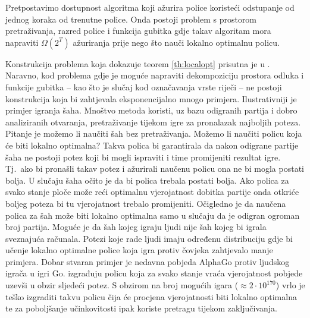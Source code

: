 \begin{theorem} \label{th:localopt}

  Pretpostavimo dostupnost algoritma koji ažurira police koristeći odstupanje od
  jednog koraka od trenutne police. Onda postoji problem s prostorom
  pretraživanja, razred police i funkcija gubitka gdje takav algoritam mora
  napraviti $\Omega(2^T)$ ažuriranja prije nego što nauči lokalno optimalnu
  policu.

\end{theorem}

Konstrukcija problema koja dokazuje teorem \ref{th:localopt} prisutna je u
\citep{daume15lols}. Naravno, kod problema gdje je moguće napraviti
dekompoziciju prostora odluka i funkcije gubitka -- kao što je slučaj kod
označavanja vrste riječi -- ne postoji konstrukcija koja bi zahtjevala
eksponencijalno mnogo primjera. Ilustrativniji je primjer igranja šaha. Mnoštvo
metoda koristi, uz bazu odigranih partija i dobro analiziranih otvaranja,
pretraživanje tijekom igre za pronalazak najboljih poteza. Pitanje je možemo li
naučiti šah bez pretraživanja. Možemo li naučiti policu koja će biti lokalno
optimalna? Takva polica bi garantirala da nakon odigrane partije šaha ne postoji
potez koji bi mogli ispraviti i time promijeniti rezultat igre. Tj.~ako bi
pronašli takav potez i ažurirali naučenu policu ona ne bi mogla postati bolja. U
slučaju šaha očito je da bi polica trebala postati bolja. Ako polica za svako
stanje ploče može reći optimalnu vjerojatnost dobitka partije onda otkriće
boljeg poteza bi tu vjerojatnost trebalo promijeniti. Očigledno je da naučena
polica za šah može biti lokalno optimalna samo u slučaju da je odigran ogroman
broj partija. Moguće je da šah kojeg igraju ljudi nije šah kojeg bi igrala
sveznajuća računala. Potezi koje rade ljudi imaju određenu distribuciju gdje bi
učenje lokalno optimalne police koja igra protiv čovjeka zahtjevalo manje
primjera. Dobar stvaran primjer je nedavna pobjeda AlphaGo protiv ljudskog
igrača u igri Go. \citet{silver2016mastering} izgrađuju policu koja za svako
stanje vraća vjerojatnost pobjede uzevši u obzir sljedeći potez. S obzirom na
broj mogućih igara ($\approx 2\cdot10^{170}$) vrlo je teško izgraditi takvu
policu čija će procjena vjerojatnosti biti lokalno optimalna te za poboljšanje
učinkovitosti ipak koriste pretragu tijekom zaključivanja.
